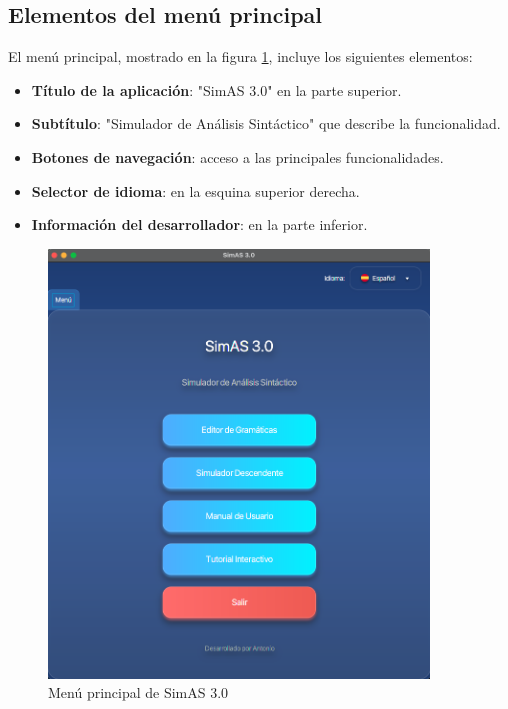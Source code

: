 \subsection{Elementos del menú principal}

El menú principal, mostrado en la figura \ref{fig:menu_principal}, incluye los siguientes elementos:

\begin{itemize}
    \item \textbf{Título de la aplicación}: \string"SimAS 3.0\string" en la parte superior.
    \item \textbf{Subtítulo}: \string"Simulador de Análisis Sintáctico\string" que describe la funcionalidad.
    \item \textbf{Botones de navegación}: acceso a las principales funcionalidades.
    \item \textbf{Selector de idioma}: en la esquina superior derecha.
    \item \textbf{Información del desarrollador}: en la parte inferior.
\end{itemize}

\needspace{8cm}
\begin{figure}[H]
    \centering
    \includegraphics[width=0.9\textwidth]{figuras/menu.png}
    \caption{Menú principal de SimAS 3.0}
    \label{fig:menu_principal}
\end{figure}


